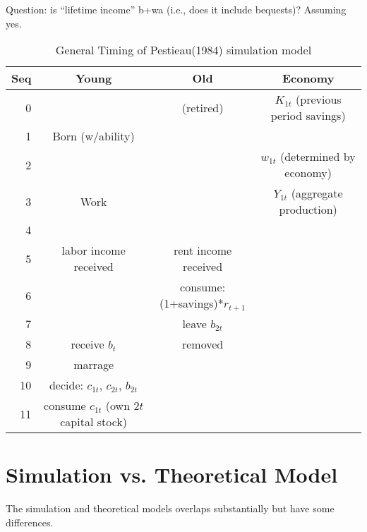 \documentclass{article}
\begin{document}
Question: is ``lifetime income'' b+wa (i.e., does it include bequests)?  Assuming yes.

\newpage
\begin{table}
\caption{General Timing of Pestieau(1984) simulation model}
\centering
\begin{tabular}{rccc}\toprule
 {\bf Seq} & {\bf Young} &  {\bf Old} & {\bf Economy} \\
\midrule
         0 &            &  (retired) & $K_{1t}$ (previous period savings) \\

         1 & Born (w/ability) &            &            \\

         2 &            &            & $w_{1t}$ (determined by economy) \\

         3 &       Work &            & $Y_{1t}$ (aggregate production) \\

         4 &            &            &            \\

         5 & labor income received & rent income received &            \\

         6 &            & consume: (1+savings)*$r_{t+1}$ &            \\

         7 &            & leave $b_{2t}$ &            \\

         8 & receive $b_{t}$ &    removed &            \\

         9 &    marrage &            &            \\

        10 & decide: $c_{1t}$, $c_{2t}$, $b_{2t}$  &            &            \\

        11 & consume $c_{1t}$ (own $2t$ capital stock) &            &            \\
\bottomrule
\end{tabular}
\end{table}


\section{Simulation vs. Theoretical Model}

The simulation and theoretical models overlaps substantially but have some differences.
\end{document}
